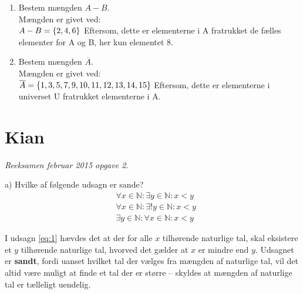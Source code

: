 \documentclass[12pt, a4paper]{article}
\begin{document}
\begin{enumerate}[label=\alph*)]
{    }   
    \item {
        Bestem mængden \begin{math} A -  B \end{math}.\\
		Mængden er givet ved:\\
        \begin{math}
            A - B = \{2, 4, 6\}\\
        \end{math}
            Eftersom, dette er elementerne i A fratrukket de fælles elementer for A og B, her kun elementet 8.\\
    }
    \item {
            Bestem mængden \begin{math} \overline{A} \end{math}.\\
		Mængden er givet ved:\\
        \begin{math}
            \overline{A} = \{1, 3, 5, 7, 9, 10, 11, 12, 13, 14, 15\}\\
        \end{math}
            Eftersom, dette er elementerne i universet U fratrukket elementerne i A.\\
    }          
\end{enumerate}

\newpage
\section{Kian}\vspace{-5pt}
\textit{Reeksamen februar 2015 opgave 2.}
\begin{tcolorbox}
a) Hvilke af følgende udsagn er sande?
\begin{align}
	&\forall x \in \mathbb{N} \! : \exists y \in \mathbb{N} \! : x < y		\label{eq:1}\\
	&\forall x \in \mathbb{N} \! : \exists !y \in \mathbb{N} \! : x < y		\label{eq:2}\\
	&\exists y \in \mathbb{N} \! : \forall x \in \mathbb{N} \! : x < y		\label{eq:3}
\end{align}
\end{tcolorbox}\vspace{-5pt}
I udsagn \eqref{eq:1} hævdes det at der for alle \(x\) tilhørende naturlige tal, skal eksistere et \(y\) tilhørende naturlige tal, hvorved det gælder at \(x\) er mindre end \(y\). Udsagnet er \textbf{sandt}, fordi uanset hvilket tal der vælges fra mængden af naturlige tal, vil det altid være muligt at finde et tal der er større -- skyldes at mængden af naturlige tal er tælleligt uendelig.
\end{document}
